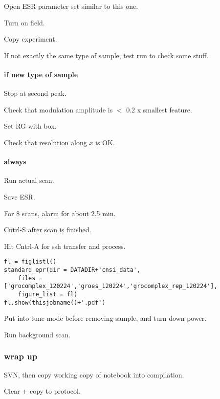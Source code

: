 Open ESR parameter set similar to this one.

Turn on field.

Copy experiment.

If not exactly the same type of sample, test run to check some stuff.


\paragraph{if new type of sample}
Stop at second peak.

Check that modulation amplitude is $<$ 0.2 x smallest feature.

Set RG with box.

Check that resolution along $x$ is OK.

\paragraph{always}

Run actual scan.

Save ESR.

For 8 scans, alarm for about 2.5 min.

Cntrl-S after scan is finished.

Hit Cntrl-A for ssh transfer and process.


\begin{tiny}
\begin{lstlisting}
fl = figlistl()
standard_epr(dir = DATADIR+'cnsi_data',
    files = ['grocomplex_120224','groes_120224','grocomplex_rep_120224'],
    figure_list = fl)
fl.show(thisjobname()+'.pdf')
\end{lstlisting}
\end{tiny}

Put into tune mode before removing sample, and turn down power.

Run background scan.

\subsubsection{wrap up}
SVN, then copy working copy of notebook into compilation.

Clear + copy to protocol.

